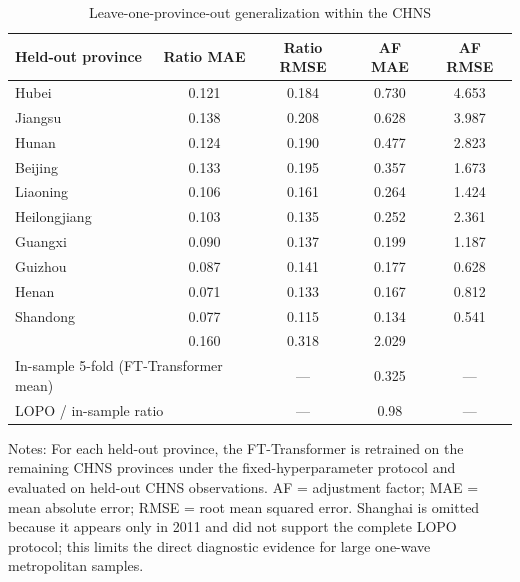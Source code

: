 \documentclass[preprint,12pt,authoryear]{elsarticle}
\begin{document}
\begin{table}[htbp]
\centering
\begin{threeparttable}
\caption{Leave-one-province-out generalization within the CHNS}
\label{tab:lopo}
\small
\setlength{\tabcolsep}{0pt} 
\begin{tabular*}{\textwidth}{@{\extracolsep{\fill}} lcccc @{}}
\toprule
Held-out province & Ratio MAE & Ratio RMSE & AF MAE & AF RMSE \\
\midrule
Hubei         & 0.121 & 0.184 & 0.730 & 4.653 \\
Jiangsu       & 0.138 & 0.208 & 0.628 & 3.987 \\
Hunan         & 0.124 & 0.190 & 0.477 & 2.823 \\
Beijing       & 0.133 & 0.195 & 0.357 & 1.673 \\
Liaoning      & 0.106 & 0.161 & 0.264 & 1.424 \\
Heilongjiang  & 0.103 & 0.135 & 0.252 & 2.361 \\
Guangxi       & 0.090 & 0.137 & 0.199 & 1.187 \\
Guizhou       & 0.087 & 0.141 & 0.177 & 0.628 \\
Henan         & 0.071 & 0.133 & 0.167 & 0.812 \\
Shandong      & 0.077 & 0.115 & 0.134 & 0.541 \\
\midrule
\addlinespace
\multicolumn{2}{l}{Mean (LOPO, 10 provinces)}                & 0.160 & 0.318 & 2.029 \\
\multicolumn{2}{l}{In-sample 5-fold (FT-Transformer mean)}   & ---   & 0.325 & ---   \\
\multicolumn{2}{l}{LOPO / in-sample ratio}                   & ---   & 0.98  & ---   \\
\bottomrule
\end{tabular*}
\begin{tablenotes}[flushleft]
\scriptsize
\item Notes: For each held-out province, the FT-Transformer is retrained on the remaining CHNS provinces under the fixed-hyperparameter protocol and evaluated on held-out CHNS observations. AF = adjustment factor; MAE = mean absolute error; RMSE = root mean squared error. Shanghai is omitted because it appears only in 2011 and did not support the complete LOPO protocol; this limits the direct diagnostic evidence for large one-wave metropolitan samples.
\end{tablenotes}
\end{threeparttable}
\end{table}
\end{document}
